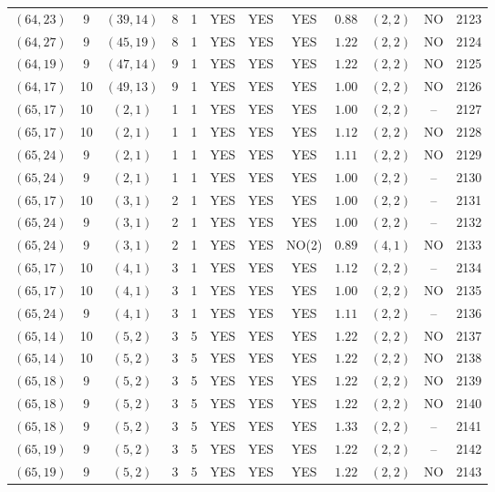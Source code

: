 \begin{longtable}{|c|c|c|c|c|c|c|c|c|c|c|c|}
$(64,23)$ & 9 & $(39,14)$ & 8 & 1 & YES & YES & YES & $0.88$ & $(2,2)$ & NO & 2123\\
$(64,27)$ & 9 & $(45,19)$ & 8 & 1 & YES & YES & YES & $1.22$ & $(2,2)$ & NO & 2124\\
$(64,19)$ & 9 & $(47,14)$ & 9 & 1 & YES & YES & YES & $1.22$ & $(2,2)$ & NO & 2125\\
$(64,17)$ & 10 & $(49,13)$ & 9 & 1 & YES & YES & YES & $1.00$ & $(2,2)$ & NO & 2126\\
$(65,17)$ & 10 & $(2,1)$ & 1 & 1 & YES & YES & YES & $1.00$ & $(2,2)$ & -- & 2127\\
$(65,17)$ & 10 & $(2,1)$ & 1 & 1 & YES & YES & YES & $1.12$ & $(2,2)$ & NO & 2128\\
$(65,24)$ & 9 & $(2,1)$ & 1 & 1 & YES & YES & YES & $1.11$ & $(2,2)$ & NO & 2129\\
$(65,24)$ & 9 & $(2,1)$ & 1 & 1 & YES & YES & YES & $1.00$ & $(2,2)$ & -- & 2130\\
$(65,17)$ & 10 & $(3,1)$ & 2 & 1 & YES & YES & YES & $1.00$ & $(2,2)$ & -- & 2131\\
$(65,24)$ & 9 & $(3,1)$ & 2 & 1 & YES & YES & YES & $1.00$ & $(2,2)$ & -- & 2132\\
$(65,24)$ & 9 & $(3,1)$ & 2 & 1 & YES & YES & NO(2) & $0.89$ & $(4,1)$ & NO & 2133\\
$(65,17)$ & 10 & $(4,1)$ & 3 & 1 & YES & YES & YES & $1.12$ & $(2,2)$ & -- & 2134\\
$(65,17)$ & 10 & $(4,1)$ & 3 & 1 & YES & YES & YES & $1.00$ & $(2,2)$ & NO & 2135\\
$(65,24)$ & 9 & $(4,1)$ & 3 & 1 & YES & YES & YES & $1.11$ & $(2,2)$ & -- & 2136\\
$(65,14)$ & 10 & $(5,2)$ & 3 & 5 & YES & YES & YES & $1.22$ & $(2,2)$ & NO & 2137\\
$(65,14)$ & 10 & $(5,2)$ & 3 & 5 & YES & YES & YES & $1.22$ & $(2,2)$ & NO & 2138\\
$(65,18)$ & 9 & $(5,2)$ & 3 & 5 & YES & YES & YES & $1.22$ & $(2,2)$ & NO & 2139\\
$(65,18)$ & 9 & $(5,2)$ & 3 & 5 & YES & YES & YES & $1.22$ & $(2,2)$ & NO & 2140\\
$(65,18)$ & 9 & $(5,2)$ & 3 & 5 & YES & YES & YES & $1.33$ & $(2,2)$ & -- & 2141\\
$(65,19)$ & 9 & $(5,2)$ & 3 & 5 & YES & YES & YES & $1.22$ & $(2,2)$ & -- & 2142\\
$(65,19)$ & 9 & $(5,2)$ & 3 & 5 & YES & YES & YES & $1.22$ & $(2,2)$ & NO & 2143\\

\end{longtable}
